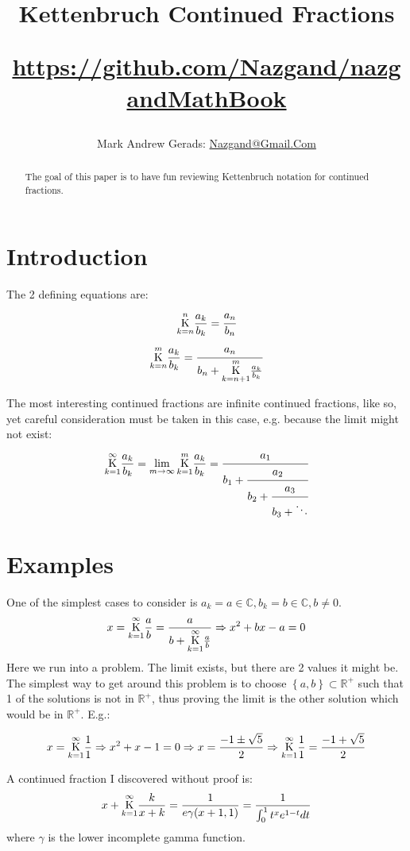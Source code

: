 \documentclass[]{article}
\author{Mark Andrew Gerads: \href{MailTo:Nazgand@Gmail.Com}{Nazgand@Gmail.Com}}
\title{
	Kettenbruch Continued Fractions
	
	\href{https://github.com/Nazgand/nazgandMathBook}{https://github.com/Nazgand/nazgandMathBook}
}
\newcommand{\Bqty}[1]{{\left\{#1\right\}}}
\newcommand{\ketten}[4]{\underset{#1}{\overset{#2}{\LARGE\mathrm K}}\frac{#3}{#4}}
\numberwithin{equation}{section}
\begin{document}
	
	\maketitle
	
	\begin{abstract}
		The goal of this paper is to have fun reviewing Kettenbruch notation for continued fractions.
	\end{abstract}
	
	\section{Introduction}
	The 2 defining equations are:
	\begin{equation}
		\ketten{k=n}{n}{a_k}{b_k}=\cfrac{a_n}{b_n}
	\end{equation}
	\begin{equation}
		\ketten{k=n}{m}{a_k}{b_k}=\cfrac{a_n}{b_n+\ketten{k=n+1}{m}{a_k}{b_k}}
	\end{equation}

	The most interesting continued fractions are infinite continued fractions, like so, yet careful consideration must be taken in this case, e.g. because the limit might not exist:
	\begin{equation}
		\ketten{k=1}{\infty}{a_k}{b_k}=
		\lim_{m\to\infty}\ketten{k=1}{m}{a_k}{b_k}=
		\cfrac{a_1}{b_1+\cfrac{a_2}{b_2+\cfrac{a_3}{b_3+\ddots}}}
	\end{equation}

	\section{Examples}
	One of the simplest cases to consider is $a_k=a\in\mathbb{C},b_k=b\in\mathbb{C},b\neq 0$.
	\begin{equation}
		x=\ketten{k=1}{\infty}{a}{b}=\frac{a}{b+\ketten{k=1}{\infty}{a}{b}}
		\Rightarrow
		x^2+bx-a=0
	\end{equation}
	Here we run into a problem. The limit exists, but there are 2 values it might be. The simplest way to get around this problem is to choose $\Bqty{a,b}\subset\mathbb{R}^+$ such that 1 of the solutions is not in $\mathbb{R}^+$, thus proving the limit is the other solution which would be in $\mathbb{R}^+$. E.g.:

	\begin{equation}
		x=\ketten{k=1}{\infty}{1}{1}
		\Rightarrow
		x^2+x-1=0
		\Rightarrow
		x=\frac{-1\pm\sqrt{5}}{2}
		\Rightarrow
		\ketten{k=1}{\infty}{1}{1}=\frac{-1+\sqrt{5}}{2}
	\end{equation}

	A continued fraction I discovered without proof is:
	\begin{equation}
		x+\ketten{k=1}{\infty}{k}{x+k}=\frac{1}{e \gamma (x+1,1)}
		=\frac{1}{\int_{0}^{1}t^x e^{1-t}dt}
	\end{equation}
	where $\gamma$ is the lower incomplete gamma function.
\end{document}
